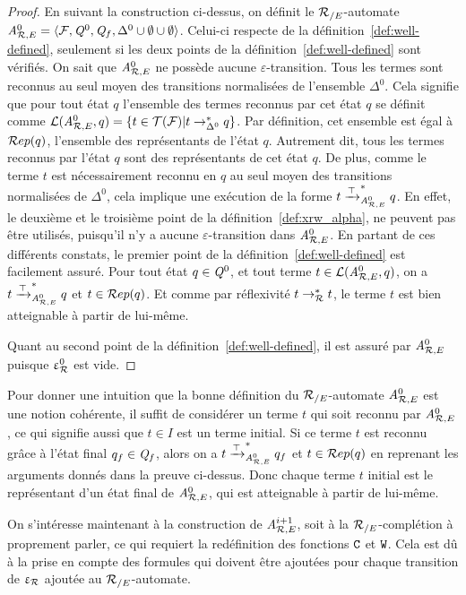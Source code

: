 \begin{proof}
  En suivant la construction ci-dessus, on définit le ${\mathcal R_{/E}}$-automate
  ${\mathit A}_{\mathcal R,E}^0 = \langle \mathcal{F}, \mathit Q^0, \mathit Q_f, \Delta^0 \cup \emptyset \cup \emptyset\rangle$.
  Celui-ci respecte de la définition~\ref{def:well-defined}, seulement si les deux points
  de la définition~\ref{def:well-defined} sont vérifiés.
  \noindent
  On sait que ${\mathit A}_{\mathcal R,E}^0$ ne possède aucune $\varepsilon$-transition.
  Tous les termes sont reconnus au seul moyen des transitions normalisées de l'ensemble $\Delta^0$.
  Cela signifie que pour tout état $q$ l'ensemble des termes reconnus par cet état $q$ 
  se définit comme $\mathcal{L}({\mathit A}_{\mathcal R,E}^0, q) = \{ t \in \mathcal{T(F)} | t \rightarrow_{\Delta^0}^* q\}$. Par définition,
  cet ensemble est égal à $\mathcal R ep(q)$, l'ensemble des représentants de l'état $q$. Autrement dit,
  tous les termes reconnus par l'état $q$ sont des représentants de cet état $q$.
  De plus, comme le terme $t$ est nécessairement reconnu en $q$ au seul moyen des transitions normalisées de $\Delta^0$,
  cela implique une exécution de la forme $t \xrightarrow{\top}_{{\mathit A}_{\mathcal R,E}^0}^* q$. En effet, le deuxième et le troisième point de la
  définition~\ref{def:xrw_alpha}, ne peuvent pas être utilisés, puisqu'il
  n'y a aucune $\varepsilon$-transition dans ${\mathit A}_{\mathcal R,E}^0$.
  En partant de ces différents constats, le premier point de la définition~\ref{def:well-defined} est facilement assuré.
  Pour tout état $q \in \mathit Q^0$, et tout terme $t \in \mathcal{L}({\mathit A}_{\mathcal R,E}^0, q)$, on a $t \xrightarrow{\top}_{{\mathit A}_{\mathcal R,E}^0}^* q$ et $t \in \mathcal R ep(q)$. 
  Et comme par réflexivité $t \rightarrow_\mathcal R^* t$, le terme $t$ est bien atteignable à partir de lui-même.
  
  Quant au second point de la définition~\ref{def:well-defined}, il est assuré par ${\mathit A}_{\mathcal R,E}^0$ puisque $\upvarepsilon_{\mathcal R}^0$ est vide.
\end{proof}

Pour donner une intuition que la bonne définition du ${\mathcal R_{/E}}$-automate ${\mathit A}_{\mathcal R,E}^0$ est une notion cohérente, il 
suffit de considérer un terme $t$ qui soit reconnu par ${\mathit A}_{\mathcal R,E}^0$, ce qui signifie aussi que $t \in I$
est un terme initial. Si ce terme $t$ est reconnu grâce à l'état final $q_f \in \mathit Q_f$,
alors on a $t \xrightarrow{\top}_{{\mathit A}_{\mathcal R,E}^0}^* q_f$ et $t \in \mathcal R ep(q)$ en reprenant les arguments donnés dans la preuve ci-dessus.
Donc chaque terme $t$ initial est le représentant d'un état final de ${\mathit A}_{\mathcal R,E}^0$, qui est atteignable à partir de 
lui-même.

On s'intéresse maintenant à la construction de ${\mathit A}_{\mathcal R,E}^{i+1}$, soit à la ${\mathcal R_{/E}}$-complétion à proprement parler, ce
qui requiert la redéfinition des fonctions $\mathtt{C}$ et $\mathtt{W}$. Cela est dû à la prise en compte des formules
qui doivent être ajoutées pour chaque transition de $\upvarepsilon_{\mathcal R}$ ajoutée au ${\mathcal R_{/E}}$-automate.

